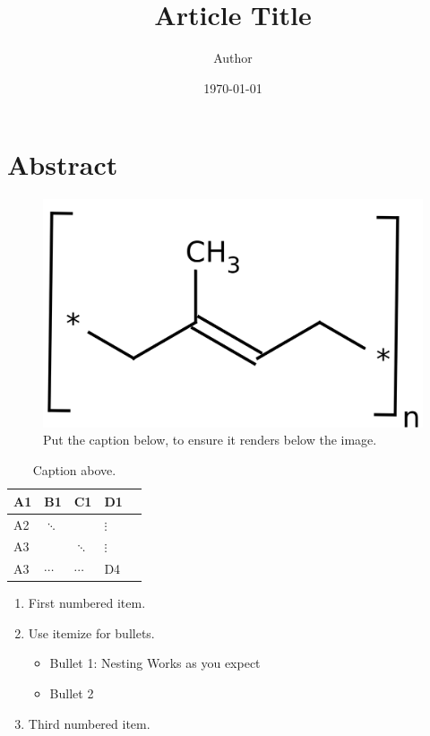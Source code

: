 \documentclass[11pt]{article}
\title{Article Title}
\author{Author}
\date{\today}
\begin{document}
\maketitle

\section*{Abstract}

\begin{figure}[h!] %
\centering %
\includegraphics[width = 2.5 in]{image.png}
\caption{Put the caption below, to ensure it renders below the image.}
\label{fig1}
\end{figure}

\begin{table}[h!] %
\centering %
\caption{Caption above.}
\label{tab1}
\begin{tabular}{| l | l | l | l | l |}
\hline A1 & B1     & C1     & D1  \\ \hline
A2 & $\ddots$ &        & $\vdots$\\ \hline
A3 &        & $\ddots$ & $\vdots$\\ \hline
A3 & $\cdots$ & $\cdots$ & D4 \\ \hline
\end{tabular}
\end{table}

\begin{enumerate}
   \item First numbered item.
   \item Use itemize for bullets.
   \begin{itemize}
      \item Bullet 1: Nesting Works as you expect
      \item Bullet 2
   \end{itemize}
   \item Third numbered item.
\end{enumerate}

%
\end{document}
